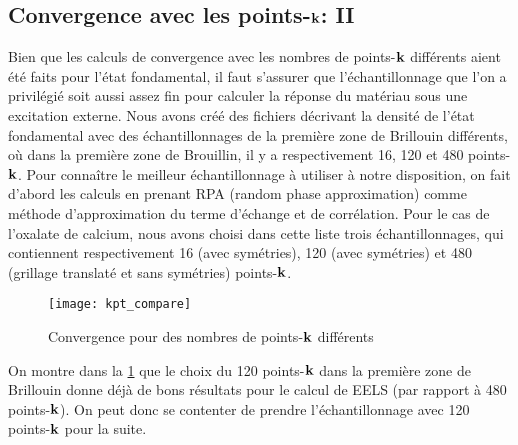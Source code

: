 \subsection{Convergence avec les points-$\vb{k}$: II}
Bien que les calculs de convergence avec les nombres de points-$\vb{k}$ différents aient été faits pour l'état fondamental,
il faut s'assurer que l'échantillonnage que l'on a privilégié soit aussi assez fin pour calculer la réponse du matériau sous une excitation externe.
Nous avons créé des fichiers décrivant la densité de l'état fondamental avec des échantillonnages
de la première zone de Brillouin différents,
où dans la première zone de Brouillin, il y a respectivement 16, 120 et 480 points-$\vb{k}$.
Pour connaître le meilleur échantillonnage à utiliser à notre disposition,
on fait d'abord les calculs en prenant RPA (random phase approximation)
comme méthode d'approximation du terme d'échange et de corrélation.
Pour le cas de l'oxalate de calcium, nous avons choisi dans cette liste trois échantillonnages,
qui contiennent respectivement 16 (avec symétries),
120 (avec symétries) et 480 (grillage translaté et sans symétries) points-$\vb{k}$.

\begin{figure}[!h]
    \centering
    \texttt{[image: kpt\_compare]}
    \caption{Convergence pour des nombres de points-$\vb{k}$ différents}\label{fig-kptCompare}
\end{figure}

On montre dans la \cref{fig-kptCompare} que le choix du 120 points-$\vb{k}$ dans la première zone de Brillouin
donne déjà de bons résultats pour le calcul de EELS (par rapport à 480 points-$\vb{k}$).
On peut donc se contenter de prendre l'échantillonnage avec 120 points-$\vb{k}$ pour la suite.

